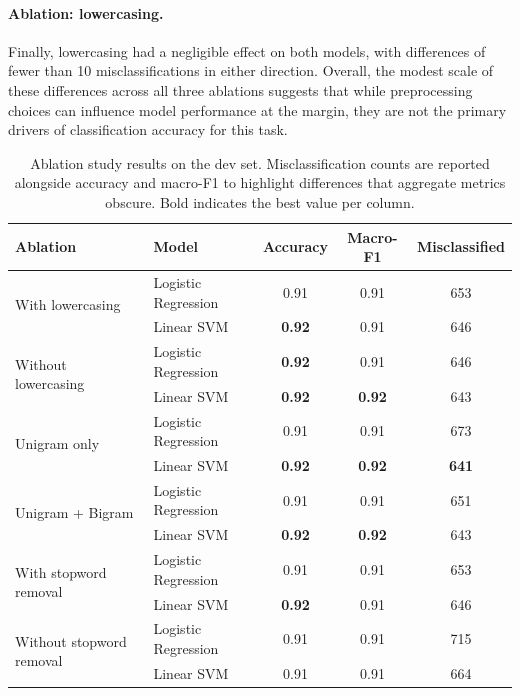 \paragraph{Ablation: lowercasing.} Finally, lowercasing had a negligible effect on both models, with differences of fewer than 10
misclassifications in either direction. Overall, the modest scale of these differences across all
three ablations suggests that while preprocessing choices can influence model performance at the
margin, they are not the primary drivers of classification accuracy for this task.

\begin{table}[h]
\centering
\begin{tabular}{llccc}
\toprule
\textbf{Ablation} & \textbf{Model} & \textbf{Accuracy} & \textbf{Macro-F1} & \textbf{Misclassified} \\
\midrule
\multirow{2}{*}{With lowercasing} & Logistic Regression & 0.91 & 0.91 & 653 \\
                                   & Linear SVM          & \textbf{0.92} & 0.91 & 646 \\
\midrule
\multirow{2}{*}{Without lowercasing} & Logistic Regression & \textbf{0.92} & 0.91 & 646 \\
                                      & Linear SVM          & \textbf{0.92} & \textbf{0.92} & 643 \\
\midrule
\multirow{2}{*}{Unigram only} & Logistic Regression & 0.91 & 0.91 & 673 \\
                               & Linear SVM          & \textbf{0.92} & \textbf{0.92} & \textbf{641} \\
\midrule
\multirow{2}{*}{Unigram + Bigram} & Logistic Regression & 0.91 & 0.91 & 651 \\
                                   & Linear SVM          & \textbf{0.92} & \textbf{0.92} & 643 \\
\midrule
\multirow{2}{*}{With stopword removal} & Logistic Regression & 0.91 & 0.91 & 653 \\
                                        & Linear SVM          & \textbf{0.92} & 0.91 & 646 \\
\midrule
\multirow{2}{*}{Without stopword removal} & Logistic Regression & 0.91 & 0.91 & 715 \\
                                           & Linear SVM          & 0.91 & 0.91 & 664 \\
\bottomrule
\end{tabular}
\caption{Ablation study results on the dev set. Misclassification counts are reported alongside accuracy and macro-F1 to highlight differences that aggregate metrics obscure. Bold indicates the best value per column.}
\label{tab:ablation}
\end{table}

